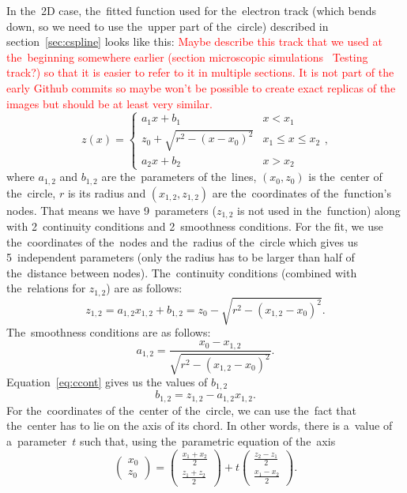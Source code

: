 		In the~2D case, the~fitted function used for the~electron track (which bends down, so we need to use the~upper part of the~circle) described in section~\ref{sec:cspline} looks like this: \textcolor{red}{Maybe describe this track that we used at the~beginning somewhere earlier (section microscopic simulations \textrightarrow~Testing track?) so that it is easier to refer to it in multiple sections. It is not part of the early Github commits so maybe won't be possible to create exact replicas of the images but should be at least very similar.}
			\begin{equation}
				\label{eq:clines2d}
				z(x) = \begin{cases}
							a_1x+b_1 & x<x_1\\
							z_0+\sqrt{r^2-(x-x_0)^2} & x_1\leq x\leq x_2\\
							a_2x+b_2 & x>x_2
					   \end{cases},
			\end{equation}
		where $a_{1,2}$ and $b_{1,2}$ are the~parameters of the~lines, $(x_0,z_0)$ is the~center of the~circle, $r$ is its radius and $(x_{1,2},z_{1,2})$ are the~coordinates of the~function's nodes. That means we have 9~parameters ($z_{1,2}$ is not used in the~function) along with 2~continuity conditions and 2~smoothness conditions. For the fit, we use the~coordinates of the~nodes and the~radius of the~circle which gives us 5~independent parameters (only the radius has to be larger than half of the~distance between nodes). The~continuity conditions (combined with the~relations for $z_{1,2}$) are as follows:
			\begin{equation}
				\label{eq:ccont}
				z_{1,2} = a_{1,2}x_{1,2}+b_{1,2} = z_0-\sqrt{r^2-(x_{1,2}-x_0)^2}.
			\end{equation}
		The~smoothness conditions are as follows:
			\begin{equation}
				\label{eq:a12}
				a_{1,2} = \frac{x_0-x_{1,2}}{\sqrt{r^2-(x_{1,2}-x_0)^2}}.
			\end{equation}
		Equation~\ref{eq:ccont} gives us the values of $b_{1,2}$
			\begin{equation}
				\label{eq:b12}
				b_{1,2} = z_{1,2} - a_{1,2} x_{1,2}.
			\end{equation}
		For the~coordinates of the~center of the~circle, we can use the~fact that the~center has to lie on the axis of its chord. In other words, there is a~value of a~parameter~$t$ such that, using the~parametric equation of the~axis
			\begin{equation}
				\begin{pmatrix} x_0\\ z_0 \end{pmatrix} = \begin{pmatrix} \frac{x_1+x_2}{2}\\ \frac{z_1+z_2}{2} \end{pmatrix} + t \begin{pmatrix} \frac{z_2-z_1}{2}\\ \frac{x_1-x_2}{2} \end{pmatrix}.   	
			\end{equation}
